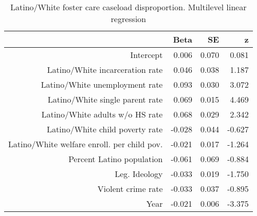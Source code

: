\begin{table}[ht]
\centering
\begin{tabular}{rrrr}
  \hline
 & Beta & SE & z \\ 
  \hline
Intercept & 0.006 & 0.070 & 0.081 \\ 
  Latino/White incarceration rate & 0.046 & 0.038 & 1.187 \\ 
  Latino/White unemployment rate & 0.093 & 0.030 & 3.072 \\ 
  Latino/White single parent rate & 0.069 & 0.015 & 4.469 \\ 
  Latino/White adults w/o HS rate & 0.068 & 0.029 & 2.342 \\ 
  Latino/White child poverty rate & -0.028 & 0.044 & -0.627 \\ 
  Latino/White welfare enroll. per child pov. & -0.021 & 0.017 & -1.264 \\ 
  Percent Latino population & -0.061 & 0.069 & -0.884 \\ 
  Leg. Ideology & -0.033 & 0.019 & -1.750 \\ 
  Violent crime rate & -0.033 & 0.037 & -0.895 \\ 
  Year & -0.021 & 0.006 & -3.375 \\ 
   \hline
\end{tabular}
\caption{Latino/White foster care caseload disproportion. Multilevel linear regression} 
\label{l.c.tab}
\end{table}

